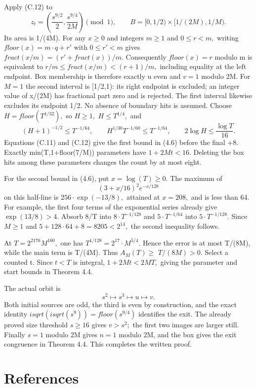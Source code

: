 \documentclass[11pt,a4paper]{article}
\begin{document}
Apply (C.12) to \[
z_t=\left(\frac{s^{9/2}}2,\frac{s^{9/4}}{2M}\right)\pmod1,
\qquad B=[0,1/2)\mathbin{\times}[1/(2M),1/M).
\] Its area is 1/(4M). For any \(x\ge 0\) and integers \(m\ge 1\) and
\(0\le r<m,\) writing \(floor(x)=m\cdot q+r'\) with \(0\le r'<m\) gives
\(fract(x/m)=(r'+fract(x))/m.\) Consequently \(floor(x)=r\) modulo m is
equivalent to \(r/m\le fract(x/m)<(r+1)/m,\) including equality at the
left endpoint. Box membership is therefore exactly u even and \(v=1\)
modulo 2M. For \(M=1\) the second interval is {[}1/2,1): its right
endpoint is excluded; an integer value of x/(2M) has fractional part
zero and is rejected. The first interval likewise excludes its endpoint
1/2. No absence of boundary hits is assumed. Choose
\(H=floor(T^{1/32}),\) so \(H\ge 1,\) \(H\le T^{1/4},\) and \[
(H+1)^{-1/2}\le T^{-1/64},\qquad
H^{1/30}T^{-1/60}\le T^{-1/64},\qquad
2\log H\le\frac{\log T}{16}.
\] Equations (C.11) and (C.12) give the first bound in (4.6) before the
final +8. Exactly min(T,1+floor(7/M)) parameters have \(1+2Mt<16.\)
Deleting the box hits among these parameters changes the count by at
most eight.

For the second bound in (4.6), put \(x=\log(T)\ge 0.\) The maximum of \[
(3+x/16)^2e^{-x/128}
\] on this half-line is \(256\cdot \exp(-13/8),\) attained at \(x=208,\)
and is less than 64. For example, the first four terms of the
exponential series already give \(\exp(13/8)>4.\) Absorb 8/T into
\(8\cdot T^{-1/128}\) and \(5\cdot T^{-1/64}\) into
\(5\cdot T^{-1/128}.\) Since \(M\ge 1\) and
\(5+128\cdot 64+8=8205<2^14,\) the second inequality follows.

At \(T=2^{2176}M^{160},\) one has \(T^{1/128}=2^17\cdot M^{5/4}.\) Hence
the error is at most T/(8M), while the main term is T/(4M). Thus
\(A_M(T)\ge\) \(T/(8M)>0.\) Select a counted t. Since \(t<T\) is
integral, \(1+2Mt<2MT,\) giving the parameter and start bounds in
Theorem 4.4.

The actual orbit is \[
s^2\longmapsto s^3\longmapsto u\longmapsto v.
\] Both initial sources are odd, the third is even by construction, and
the exact identity \(isqrt(isqrt(s^9))=floor(s^{9/4})\) identifies the
exit. The already proved size threshold \(s\ge 16\) gives \(v>s^2;\) the
first two images are larger still. Finally \(s=1\) modulo 2M gives
\(n=1\) modulo 2M, and the box gives the exit congruence in Theorem 4.4.
This completes the written proof.

\clearpage

\section{References}\label{references}
\end{document}
